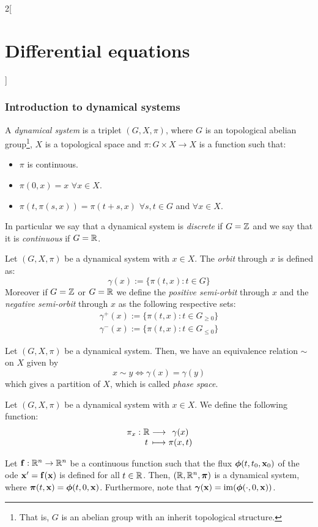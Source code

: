 \documentclass[../../../main.tex]{subfiles}
\begin{document}
\begin{multicols}{2}[\section{Differential equations}]
  \subsubsection{Introduction to dynamical systems}
  \begin{definition}
    A \textit{dynamical system} is a triplet $(G,X,\pi)$, where $G$ is an topological abelian group\footnote{That is, $G$ is an abelian group with an inherit topological structure.}, $X$ is a topological space and $\pi:G\times X\rightarrow X$ is a function such that:
    \begin{itemize}
      \item $\pi$ is continuous.
      \item $\pi(0,x)=x$ $\forall x\in X$.
      \item $\pi(t,\pi(s,x))=\pi(t+s,x)$ $\forall s,t\in G$ and $\forall x\in X$.
    \end{itemize}
    In particular we say that a dynamical system is \textit{discrete} if $G=\mathbb{Z}$ and we say that it is \textit{continuous} if $G=\mathbb{R}$.
  \end{definition}
  \begin{definition}
    Let $(G,X,\pi)$ be a dynamical system with $x\in X$. The \textit{orbit} through $x$ is defined as: $$\gamma(x):=\{\pi(t,x):t\in G\}$$ Moreover if $G=\mathbb{Z}$ or $G=\mathbb{R}$ we define the \textit{positive semi-orbit} through $x$ and the \textit{negative semi-orbit} through $x$ as the following respective sets:
    \begin{gather*}
      \gamma^+(x):=\{\pi(t,x):t\in G_{\geq 0}\}\\
      \gamma^-(x):=\{\pi(t,x):t\in G_{\leq 0}\}
    \end{gather*}
  \end{definition}
  \begin{definition}
    Let $(G,X,\pi)$ be a dynamical system. Then, we have an equivalence relation $\sim$ on $X$ given by $$x\sim y\iff\gamma(x)=\gamma(y)$$
    which gives a partition of $X$, which is called \textit{phase space}.
  \end{definition}
  \begin{definition}
    Let $(G,X,\pi)$ be a dynamical system with $x\in X$. We define the following function: $$\function{\pi_x}{\RR}{\gamma(x)}{t}{\pi(x,t)}$$
  \end{definition}
  \begin{lemma}
    Let $\boldsymbol{\mathrm{f}}:\mathbb{R}^n\rightarrow\mathbb{R}^n$ be a continuous function such that the flux $\boldsymbol{\mathrm{\phi}}(t,t_0,\boldsymbol{\mathrm{x}}_0)$ of the ode $\boldsymbol{\mathrm{x}}' =\boldsymbol{\mathrm{f}}(\boldsymbol{\mathrm{x}})$ is defined for all $t\in\mathbb{R}$. Then, $(\mathbb{R},\mathbb{R}^n,\boldsymbol{\mathrm{\pi}})$ is a dynamical system, where $\boldsymbol{\mathrm{\pi}}(t,\boldsymbol{\mathrm{x}})=\boldsymbol{\mathrm{\phi}}(t,0,\boldsymbol{\mathrm{x}})$. Furthermore, note that $\boldsymbol{\mathrm{\gamma}}(\boldsymbol{\mathrm{x}})=\operatorname{im}(\boldsymbol{\mathrm{\phi}}(\cdot,0,\boldsymbol{\mathrm{x}}))$.

\end{lemma}
\end{multicols}
\end{document}
